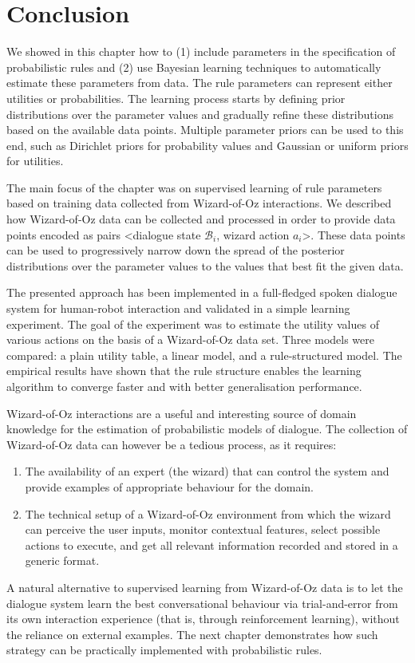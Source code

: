\section{Conclusion}
\label{sec:woz-conclusions}


We showed in this chapter how to (1) include parameters in the specification of probabilistic rules and (2) use Bayesian learning techniques to automatically estimate these parameters from data.  The rule parameters can represent either utilities or probabilities.  The learning process starts by defining prior distributions over the parameter values and gradually refine these distributions based on the available data points. Multiple parameter priors can be used to this end, such as Dirichlet priors for probability values and Gaussian or uniform priors for utilities. 

The main focus of the chapter was on supervised learning of rule parameters based on training data collected from Wizard-of-Oz interactions. We described how Wizard-of-Oz data can be collected and processed in order to provide data points encoded as pairs <dialogue state $\mathcal{B}_i$, wizard action $a_i$>.  
These data points can be used to progressively narrow down the spread of the posterior distributions over the parameter values to the values that best fit the given data. 

The presented approach has been implemented in a full-fledged spoken dialogue system for human-robot interaction and validated in a simple learning experiment.  The goal of the experiment was to estimate the utility values of various actions on the basis of a Wizard-of-Oz data set.  Three models were compared: a plain utility table, a linear model, and a rule-structured model. The empirical results have shown that the rule structure enables the learning algorithm to converge faster and with better generalisation performance.

Wizard-of-Oz interactions are a useful and interesting source of domain knowledge for the estimation of probabilistic models of dialogue. The collection of Wizard-of-Oz data can however be a tedious process, as it requires:
\begin{enumerate}
\item The availability of an expert (the wizard) that can control the system and provide examples of appropriate behaviour for the domain.
\item The technical setup of a Wizard-of-Oz environment from which the wizard can perceive the user inputs, monitor contextual features, select possible actions to execute, and get all relevant information recorded and stored in a generic format. 
\end{enumerate}

A natural alternative to supervised learning from Wizard-of-Oz data is to let the dialogue system learn the best conversational behaviour via trial-and-error from its own interaction experience (that is, through reinforcement learning), without the reliance on external examples.  The next chapter demonstrates how such strategy can be practically implemented with probabilistic rules. 
